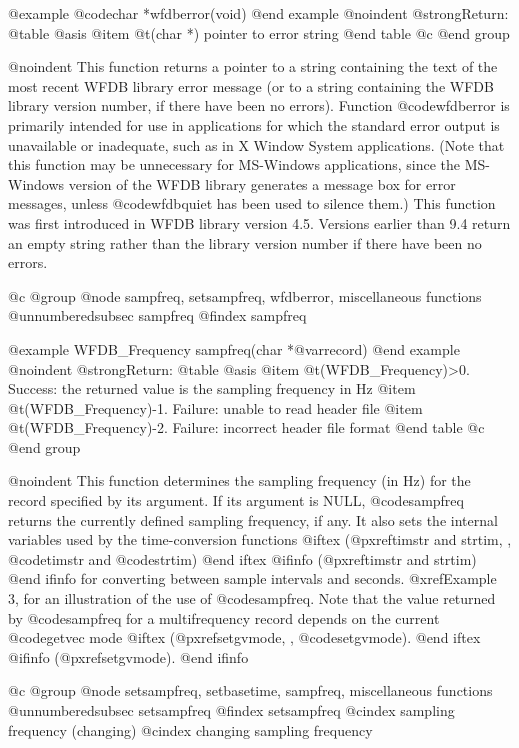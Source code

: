 {{{{{{{{{@example
@code{char *wfdberror(void)}
@end example
@noindent
@strong{Return:}
@table @asis
@item @t{(char *)}
pointer to error string
@end table
@c @end group

@noindent
This function returns a pointer to a string containing the text of the
most recent WFDB library error message (or to a string containing the WFDB
library version number, if there have been no errors).  Function
@code{wfdberror} is primarily intended for use in applications for which the
standard error output is unavailable or inadequate, such as in X Window
System applications.  (Note that this function may be unnecessary for
MS-Windows applications, since the MS-Windows version of the WFDB library
generates a message box for error messages, unless @code{wfdbquiet} has
been used to silence them.)  This function was first introduced in WFDB
library version 4.5.  Versions earlier than 9.4 return an empty string
rather than the library version number if there have been no errors.

@c @group
@node     sampfreq, setsampfreq, wfdberror, miscellaneous functions
@unnumberedsubsec sampfreq
@findex sampfreq

@example
WFDB_Frequency sampfreq(char *@var{record})
@end example
@noindent
@strong{Return:}
@table @asis
@item @t{(WFDB_Frequency)>0.}
Success: the returned value is the sampling frequency in Hz
@item @t{(WFDB_Frequency)-1.}
Failure: unable to read header file
@item @t{(WFDB_Frequency)-2.}
Failure: incorrect header file format
@end table
@c @end group

@noindent
This function determines the sampling frequency (in Hz) for the record
specified by its argument.  If its argument is NULL, @code{sampfreq}
returns the currently defined sampling frequency, if any.  It also sets
the internal variables used by the time-conversion functions
@iftex
(@pxref{timstr and strtim, , @code{timstr} and @code{strtim}})
@end iftex
@ifinfo
(@pxref{timstr and strtim})
@end ifinfo
for converting between sample intervals and seconds.  @xref{Example 3},
for an illustration of the use of @code{sampfreq}.  Note that the value
returned by @code{sampfreq} for a multifrequency record depends on the
current @code{getvec} mode
@iftex
(@pxref{setgvmode, , @code{setgvmode}}).
@end iftex
@ifinfo
(@pxref{setgvmode}).
@end ifinfo

@c @group
@node     setsampfreq, setbasetime, sampfreq, miscellaneous functions
@unnumberedsubsec setsampfreq
@findex setsampfreq
@cindex sampling frequency (changing)
@cindex changing sampling frequency

}}}}}}}}}

